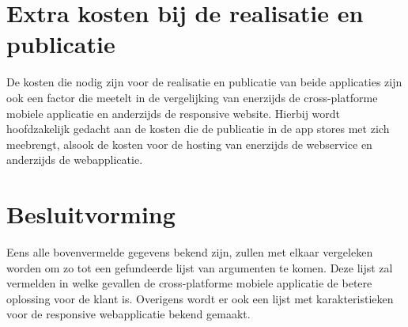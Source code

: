 \section{Extra kosten bij de realisatie en publicatie}
De kosten die nodig zijn voor de realisatie en publicatie van beide applicaties zijn ook een factor die meetelt in de vergelijking
van enerzijds de cross-platforme mobiele applicatie en anderzijds de responsive website. Hierbij wordt hoofdzakelijk gedacht aan
de kosten die de publicatie in de app stores met zich meebrengt, alsook de kosten voor de hosting van enerzijds de webservice en
anderzijds de webapplicatie.

\section{Besluitvorming}
Eens alle bovenvermelde gegevens bekend zijn, zullen met elkaar vergeleken worden om zo tot een gefundeerde lijst van argumenten
te komen. Deze lijst zal vermelden in welke gevallen de cross-platforme mobiele applicatie de betere oplossing voor de klant is.
Overigens wordt er ook een lijst met karakteristieken voor de responsive webapplicatie bekend gemaakt.
